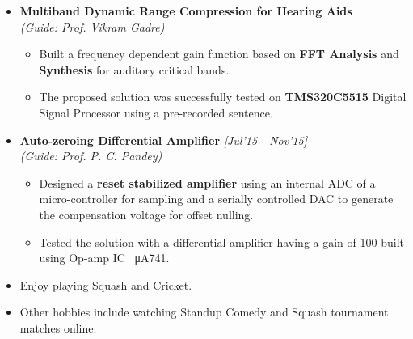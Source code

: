 \documentclass{article}
\begin{document}
\begin{itemize}[leftmargin=3.5mm]
	\setlength{\itemsep}{-0.29em}
	\item \textbf{Multiband Dynamic Range Compression for Hearing Aids}\hfill{}
	\\\textit{(Guide: Prof. Vikram Gadre)}
	\vspace{-8pt}
	\begin{itemize}[leftmargin=3.5mm]
		\vspace{-0.5mm}
		\setlength{\itemsep}{1mm}
		\item Built a frequency dependent gain function based on \textbf{FFT Analysis} and \textbf{Synthesis }for auditory critical bands.
		\vspace{-1.5mm}
		\item The proposed solution was successfully tested on \textbf{TMS320C5515} Digital Signal Processor using a pre-recorded sentence.
	\end{itemize}
\end{itemize}
\vspace{-5mm}
\begin{itemize}[leftmargin=3.5mm]
	\setlength{\itemsep}{-0.29em}
	\item \textbf{Auto-zeroing Differential Amplifier   }\hfill{\textit{[Jul'15 - Nov'15]}}
	\\\textit{(Guide: Prof. P. C. Pandey)}
	\vspace{-8pt}
	\begin{itemize}[leftmargin=3.5mm]
		\vspace{-0.5mm}
		\setlength{\itemsep}{1mm}
		\item Designed a \textbf{reset stabilized amplifier} using an internal ADC of a micro-controller for sampling and a serially controlled DAC to generate the compensation voltage for offset nulling.
		\vspace{-1.5mm}
		\item Tested the solution with a differential amplifier having a gain of 100 built using Op-amp IC \SI{}{\micro\A}741.
	\end{itemize}
\end{itemize}




\underline{}
\begin{itemize}[leftmargin=3.5mm]
	\vspace{-0.5mm}
	\setlength{\itemsep}{1mm}
	\item Enjoy playing Squash and Cricket.
	\vspace{-1.5mm}
	\item Other hobbies include watching Standup Comedy and Squash tournament matches online.  
\end{itemize}
\end{document}
